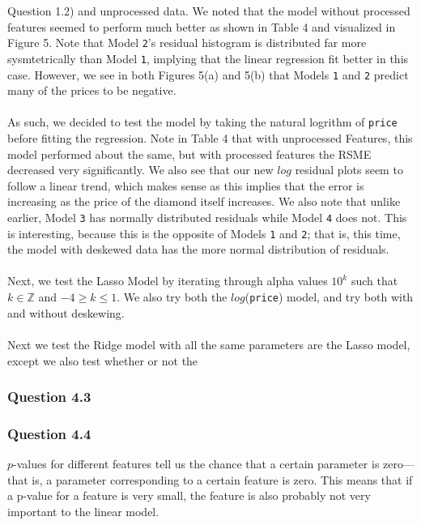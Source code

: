 \documentclass[11pt,letterpaper]{article}
\begin{document}
Question 1.2) and unprocessed data. We noted that the model without processed features
seemed to perform much better as shown in Table 4 and visualized in Figure 5. Note that
Model \texttt{2}'s residual histogram is distributed far more sysmtetrically than 
Model \texttt{1}, implying that the linear regression fit better in this case.
However, we see in both Figures 5(a) and 5(b) that Models \texttt{1} and \texttt{2} 
predict many of the prices to be negative. \\\\
As such, we decided to test the model by taking the natural logrithm of 
\texttt{price} before fitting the regression. Note in Table 4 that with unprocessed 
Features, this model performed about the same, but with processed features the RSME 
decreased very significantly. We also see that our new $log$ residual plots seem to 
follow a linear trend, which makes sense as this implies that the error is increasing
as the price of the diamond itself increases. We also note that unlike earlier, Model
\texttt{3} has normally distributed residuals while Model \texttt{4} does not. This is
interesting, because this is the opposite of Models \texttt{1} and \texttt{2}; that is,
this time, the model with deskewed data has the more normal distribution of residuals.\\\\

Next, we test the Lasso Model by iterating through alpha values $10^k$ such that 
$k\in \mathbb{Z}$ and $-4 \geq k \leq 1$. We also try both the $log$(\texttt{price})
model, and try both with and without deskewing. \\\\

Next we test the Ridge model with all the same parameters are the Lasso model, except
we also test whether or not the 





\subsubsection*{Question 4.3}

\subsubsection*{Question 4.4}
$p$-values for different features tell us the chance that a certain parameter is zero—
that is, a parameter corresponding to a certain feature is zero. This means that if a
p-value for a feature is very small, the feature is also probably not very important to
the linear model. 
\end{document}
